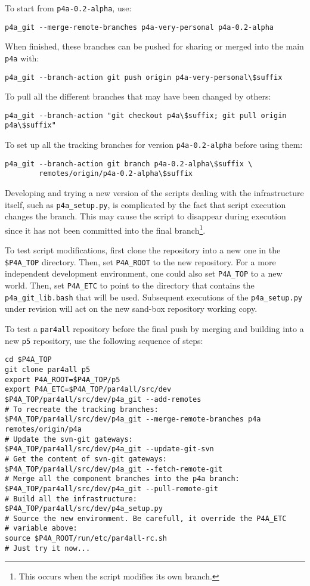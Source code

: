 \documentclass[a4paper]{article}
\begin{document}
To start from \texttt{p4a-0.2-alpha}, use:
\begin{verbatim}
p4a_git --merge-remote-branches p4a-very-personal p4a-0.2-alpha
\end{verbatim}

When finished, these branches can be pushed for sharing or merged
into the main \Apfa \texttt{p4a} with:
\begin{verbatim}
p4a_git --branch-action git push origin p4a-very-personal\$suffix
\end{verbatim}

To pull all the different \Apfa branches that may have been
changed by others:
\begin{verbatim}
p4a_git --branch-action "git checkout p4a\$suffix; git pull origin p4a\$suffix"
\end{verbatim}

To set up all the tracking branches for version
\texttt{p4a-0.2-alpha} before using them:
\begin{verbatim}
p4a_git --branch-action git branch p4a-0.2-alpha\$suffix \
        remotes/origin/p4a-0.2-alpha\$suffix
\end{verbatim}
\texttt{}
Developing and trying a new version of the scripts dealing with
the \Apfa infrastructure itself, such as \verb|p4a_setup.py|, is
complicated by the fact that script execution changes the branch. This may
cause the script to disappear during execution since it has not been
committed into the final branch\footnote{This occurs when the script
  modifies its own branch. \smiley}.

To test script modifications, first clone the repository into a new
one in the \verb|$P4A_TOP| %
directory. Then, set \verb|P4A_ROOT| to the new repository.
For a more independent development environment, one could also set
\verb|P4A_TOP| to a new world.
Then, set \verb|P4A_ETC| to point to the directory
that contains the \verb|p4a_git_lib.bash| that will be
used. Subsequent executions of the \verb|p4a_setup.py| under revision
will act on the new sand-box repository working copy.

To test a \texttt{par4all} repository before the final push by
merging and building into a new \texttt{p5} repository, use the
following sequence of steps:
\begin{verbatim}
cd $P4A_TOP
git clone par4all p5
export P4A_ROOT=$P4A_TOP/p5
export P4A_ETC=$P4A_TOP/par4all/src/dev
$P4A_TOP/par4all/src/dev/p4a_git --add-remotes
# To recreate the tracking branches:
$P4A_TOP/par4all/src/dev/p4a_git --merge-remote-branches p4a remotes/origin/p4a
# Update the svn-git gateways:
$P4A_TOP/par4all/src/dev/p4a_git --update-git-svn
# Get the content of svn-git gateways:
$P4A_TOP/par4all/src/dev/p4a_git --fetch-remote-git
# Merge all the component branches into the p4a branch:
$P4A_TOP/par4all/src/dev/p4a_git --pull-remote-git
# Build all the infrastructure:
$P4A_TOP/par4all/src/dev/p4a_setup.py
# Source the new environment. Be carefull, it override the P4A_ETC
# variable above:
source $P4A_ROOT/run/etc/par4all-rc.sh
# Just try it now...
\end{verbatim}
\end{document}

